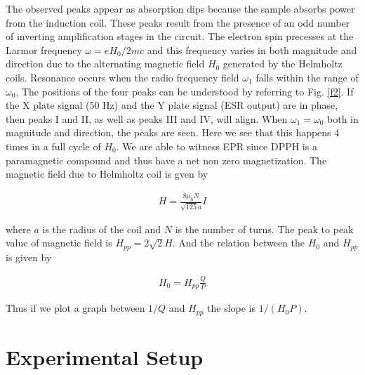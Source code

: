 The observed peaks appear as absorption dips because the sample absorbs power from the induction
coil. These peaks result from the presence of an odd
number of inverting amplification stages in the circuit. The electron spin precesses at the Larmor frequency $\omega = eH_0/2mc$ and this frequency varies in both
magnitude and direction due to the alternating magnetic field $H_0$ generated by the Helmholtz coils. Resonance occurs when the radio frequency field $\omega_1$ falls
within the range of $\omega_0$, The positions of the four
peaks can be understood by referring to Fig. \ref{f2}. If
the X plate signal (50 Hz) and the Y plate signal
(ESR output) are in phase, then peaks I and II, as
well as peaks III and IV, will align. When $\omega_1 = \omega_0$
both in magnitude and direction, the peaks are seen. Here we
see that this happens 4 times in a full cycle of $H_0$.
We are able to witness EPR since DPPH is a paramagnetic compound and thus have a net non zero
magnetization. The magnetic field due to Helmholtz
coil is gven by

\begin{align}
    H = \frac{8\mu_0 N}{\sqrt{125} a}I
\end{align}

where $a$ is the radius of the coil and $N$ is the number
of turns. The peak to peak value of magnetic field is
$H_{pp} = 2\sqrt{2}H$. And the relation between the $H_0$ and
$H_{pp}$ is given by

\begin{align}
    H_0 = H_{pp}\frac{Q}{P}
\end{align}

Thus if we plot a graph between $1/Q$ and $H_{pp}$ the
slope is $1/(H_0 P)$.
\section{Experimental Setup}


